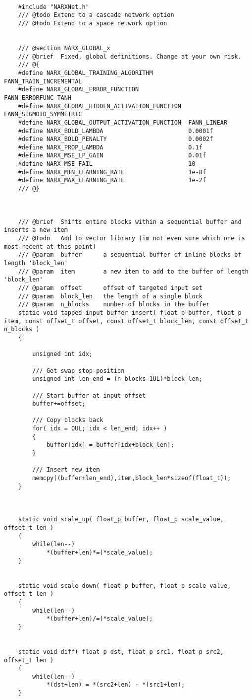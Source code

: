 \begin{lstlisting}

	#include "NARXNet.h"
	/// @todo Extend to a cascade network option
	/// @todo Extend to a space network option


	/// @section NARX_GLOBAL_x
	/// @brief	Fixed, global definitions. Change at your own risk.
	/// @{
	#define NARX_GLOBAL_TRAINING_ALGORITHM			FANN_TRAIN_INCREMENTAL
	#define NARX_GLOBAL_ERROR_FUNCTION				FANN_ERRORFUNC_TANH
	#define NARX_GLOBAL_HIDDEN_ACTIVATION_FUNCTION	FANN_SIGMOID_SYMMETRIC
	#define NARX_GLOBAL_OUTPUT_ACTIVATION_FUNCTION	FANN_LINEAR
	#define NARX_BOLD_LAMBDA						0.0001f
	#define NARX_BOLD_PENALTY						0.0002f
	#define NARX_PROP_LAMBDA						0.1f
	#define NARX_MSE_LP_GAIN						0.01f
	#define	NARX_MSE_FAIL							10
	#define NARX_MIN_LEARNING_RATE					1e-8f
	#define NARX_MAX_LEARNING_RATE					1e-2f
	/// @}



	/// @brief	Shifts entire blocks within a sequential buffer and inserts a new item 
	///	@todo	Add to vector library (im not even sure which one is most recent at this point)
	///	@param	buffer		a sequential buffer of inline blocks of length 'block_len'
	/// @param	item		a new item to add to the buffer of length 'block_len'
	/// @param	offset		offset of targeted input set
	/// @param	block_len	the length of a single block
	///	@param	n_blocks	number of blocks in the buffer
	static void tapped_input_buffer_insert( float_p buffer, float_p item, const offset_t offset, const offset_t block_len, const offset_t n_blocks )
	{

		unsigned int idx;

		/// Get swap stop-position
		unsigned int len_end = (n_blocks-1UL)*block_len;
		
		/// Start buffer at input offset
		buffer+=offset;

		/// Copy blocks back
		for( idx = 0UL; idx < len_end; idx++ )
		{
			buffer[idx] = buffer[idx+block_len];	
		}

		/// Insert new item
		memcpy((buffer+len_end),item,block_len*sizeof(float_t));
	}



	static void scale_up( float_p buffer, float_p scale_value, offset_t len )
	{
		while(len--)
			*(buffer+len)*=(*scale_value);
	}


	static void scale_down( float_p buffer, float_p scale_value, offset_t len )
	{
		while(len--)
			*(buffer+len)/=(*scale_value);
	}


	static void diff( float_p dst, float_p src1, float_p src2, offset_t len )
	{
		while(len--)
			*(dst+len) = *(src2+len) - *(src1+len);
	}



\end{lstlisting}
